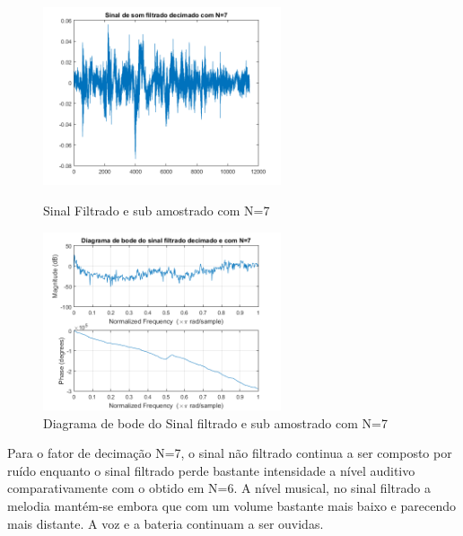 \documentclass[11pt]{article}
\begin{document}
\newpage
\begin{figure}[h]
\begin{center}
\begin{minipage}[b]{0.45\linewidth}
\includegraphics[width=7cm]{fds7.png}
\caption{Sinal Filtrado e sub amostrado com N=7}
\label{figura11}
\end{minipage}
\begin{minipage}[b]{0.45\linewidth}
\includegraphics[width=7cm]{fdb7.png}
\caption{Diagrama de bode do Sinal filtrado e sub amostrado com N=7}
\label{figura}
\end{minipage}
\end{center}
\end{figure}
Para o fator de decimação N=7, o sinal não filtrado continua a ser composto por ruído enquanto o sinal filtrado perde bastante intensidade a nível auditivo comparativamente com o obtido em N=6. A nível musical, no sinal filtrado a melodia mantém-se embora que com um volume bastante mais baixo e parecendo mais distante. A voz e a bateria continuam a ser ouvidas.

\newpage
\end{document}
